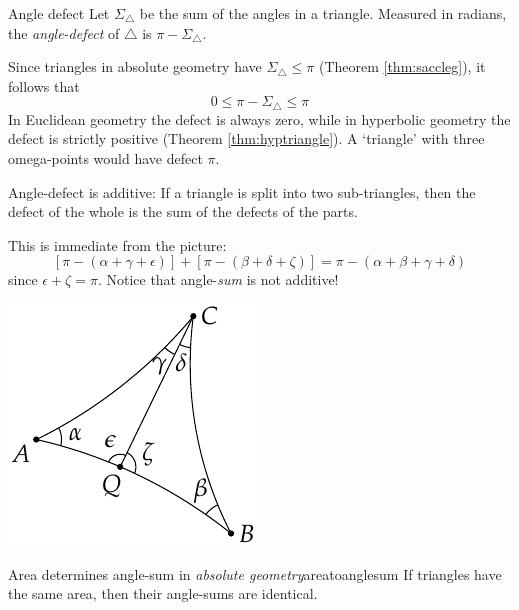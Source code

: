 \begin{defn}{Angle defect}{}
	Let $\Sigma_\triangle$ be the sum of the angles in a triangle. Measured in radians, the \emph{angle-defect} of $\triangle$ is $\pi-\Sigma_\triangle$.
\end{defn}

Since triangles in absolute geometry have $\Sigma_\triangle\le\pi$ (Theorem \ref{thm:saccleg}), it follows that
\[
	0\le\pi-\Sigma_\triangle\le\pi
\]
In Euclidean geometry the defect is always zero, while in hyperbolic geometry the defect is strictly positive (Theorem \ref{thm:hyptriangle}). A `triangle' with three omega-points would have defect $\pi$.

\begin{minipage}[t]{0.74\linewidth}\vspace{0pt}
	\begin{lemm}{}{}
		Angle-defect is additive: If a triangle is split into two sub-triangles, then the defect of the whole is the sum of the defects of the parts.
	\end{lemm}
	
	This is immediate from the picture:
	\[
		\left[\pi-(\alpha+\gamma+\epsilon)\right]+\left[\pi-(\beta+\delta+\zeta)\right]=\pi-(\alpha+\beta+\gamma+\delta)
	\]
	since $\epsilon+\zeta=\pi$. Notice that angle-\emph{sum} is not additive!
\end{minipage}
\hfill
\begin{minipage}[t]{0.25\linewidth}\vspace{-15pt}
	\flushright\includegraphics{area-defect}
\end{minipage}



\begin{thm}{Area determines angle-sum in \emph{absolute geometry}}{areatoanglesum}
	If triangles have the same area, then their angle-sums are identical.
\end{thm}

